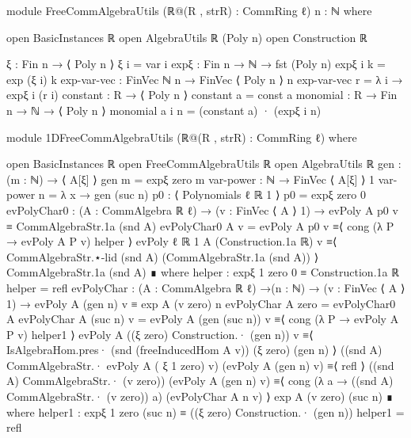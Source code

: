   module FreeCommAlgebraUtils (ℝ@(R , strR) : CommRing ℓ) {n : ℕ} where

    open BasicInstances ℝ
    open AlgebraUtils ℝ (Poly n)
    open Construction ℝ 

    ξ : Fin n → ⟨ Poly n ⟩
    ξ i = var i
    expξ : Fin n → ℕ → fst (Poly n)
    expξ i k = exp (ξ i) k
    exp-var-vec : FinVec ℕ n →  FinVec ⟨ Poly n ⟩ n
    exp-var-vec r = λ i → expξ i (r i)
    constant : R → ⟨ Poly n ⟩
    constant a = const a
    monomial : R → Fin n → ℕ → ⟨ Poly n ⟩
    monomial a i n = (constant a) · (expξ i n)

  module 1DFreeCommAlgebraUtils (ℝ@(R , strR) : CommRing ℓ) where

    open BasicInstances ℝ
    open FreeCommAlgebraUtils ℝ
    open AlgebraUtils ℝ
    gen : (m : ℕ) → ⟨ A[ξ] ⟩
    gen m = expξ zero m
    var-power : ℕ → FinVec ⟨ A[ξ] ⟩ 1
    var-power n = λ x → gen (suc n)
    p0 : ⟨ Polynomials {ℓ} {ℝ} 1 ⟩
    p0 = expξ zero 0
    evPolyChar0 : (A : CommAlgebra ℝ ℓ) → (v : FinVec ⟨ A ⟩ 1) → evPoly A p0 v ≡ CommAlgebraStr.1a (snd A)
    evPolyChar0 A v = evPoly A p0 v ≡⟨ cong (λ P → evPoly A P v) helper ⟩ 
                      evPoly {ℓ} {ℝ} {1} A (Construction.1a ℝ) v ≡⟨ CommAlgebraStr.⋆-lid (snd A) (CommAlgebraStr.1a (snd A)) ⟩ 
                      CommAlgebraStr.1a (snd A) ∎
      where
        helper : expξ {1} zero 0 ≡ Construction.1a ℝ
        helper = refl
    evPolyChar : (A : CommAlgebra ℝ ℓ) →(n : ℕ) → (v : FinVec ⟨ A ⟩ 1) → evPoly A (gen n) v ≡ exp A (v zero) n
    evPolyChar A zero = evPolyChar0 A
    evPolyChar A (suc n) v = evPoly A (gen (suc n)) v                                                       ≡⟨ cong (λ P → evPoly A P v) helper1 ⟩ 
                             evPoly A ((ξ zero) Construction.· (gen n)) v                                   ≡⟨ IsAlgebraHom.pres· (snd (freeInducedHom A v)) (ξ zero) (gen n) ⟩ 
                             ((snd A) CommAlgebraStr.· evPoly A ( ξ {1} zero) v) (evPoly A (gen n) v)  ≡⟨ refl ⟩ 
                             ((snd A) CommAlgebraStr.· (v zero)) (evPoly A (gen n) v)                                 ≡⟨ cong (λ a → ((snd A) CommAlgebraStr.· (v zero)) a) (evPolyChar A n v) ⟩ 
                             exp A (v zero) (suc n) ∎
      where
        helper1 : expξ {1} zero (suc n) ≡ ((ξ zero) Construction.· (gen n))
        helper1 = refl

